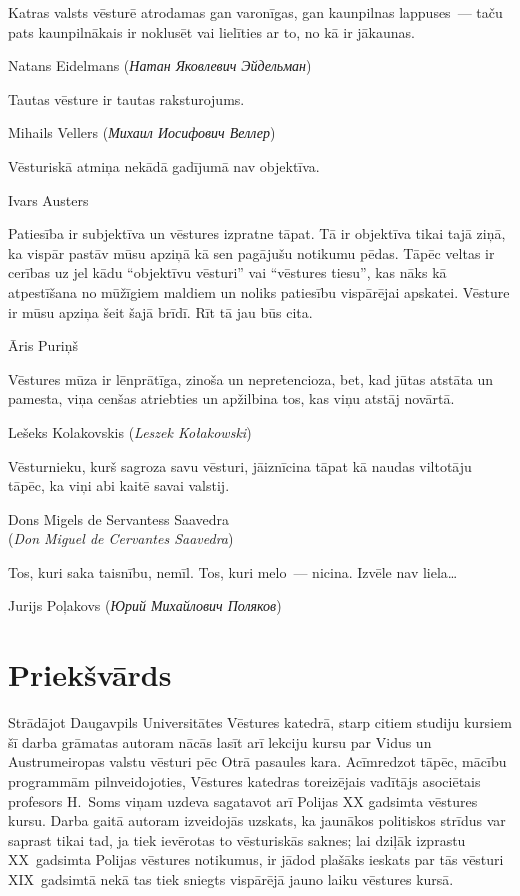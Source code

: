 \documentclass[twoside,a5paper,12pt,fleqn,openany]{extbook}
\newcommand{\pltxti}[1]{\textit{\textpolish{#1}}}
\newcommand{\rutxti}[1]{\textit{\textrussian{#1}}}
\newcommand{\estxti}[1]{\textit{\textspanish{#1}}}
\begin{document}
\epigraph
{Katras valsts vēsturē atrodamas gan varonīgas, gan kaunpilnas lappuses~--- taču pats kaunpilnākais ir noklusēt vai lielīties ar to, no kā ir jākaunas.}
{Natans Eidelmans (\rutxti{Натан Яковлевич Эйдельман})}

\epigraph
{Tautas vēsture ir tautas raksturojums.}
{Mihails Vellers (\rutxti{Михаил Иосифович Веллер})}

\epigraph
{Vēsturiskā atmiņa nekādā gadījumā nav objektīva.}
{Ivars Austers}

\newpage

\epigraph
{Patiesība ir subjektīva un vēstures izpratne tāpat.
Tā ir objektīva tikai tajā ziņā, ka vispār pastāv mūsu apziņā kā sen pagājušu notikumu pēdas.
Tāpēc veltas ir cerības uz jel kādu ``objektīvu vēsturi” vai ``vēstures tiesu”, kas nāks kā atpestīšana no mūžīgiem maldiem un noliks patiesību vispārējai apskatei.
Vēsture ir mūsu apziņa šeit šajā brīdī.
Rīt tā jau būs cita.}
{Āris Puriņš}

\epigraph
{Vēstures mūza ir lēnprātīga, zinoša un nepretencioza, bet, kad jūtas atstāta un pamesta, viņa cenšas atriebties un apžilbina tos, kas viņu atstāj novārtā.}
{Lešeks Kolakovskis (\pltxti{Leszek Kołakowski})}

\epigraph
{Vēsturnieku, kurš sagroza savu vēsturi, jāiznīcina tāpat kā naudas viltotāju tāpēc, ka viņi abi kaitē savai valstij.}
{Dons Migels de Servantess Saavedra\\(\estxti{Don Miguel de Cervantes Saavedra})}

\epigraph
{Tos, kuri saka taisnību, nemīl.
Tos, kuri melo~--- nicina.
Izvēle nav liela\ldots{}}
{Jurijs Poļakovs (\rutxti{Юрий Михайлович Поляков})}

\tableofcontents

\chapter*{Priekšvārds}

Strādājot Daugavpils Universitātes Vēstures katedrā, starp citiem studiju kursiem šī darba grāmatas autoram nācās lasīt arī lekciju kursu par Vidus un Austrumeiropas valstu vēsturi pēc Otrā pasaules kara.
Acīmredzot tāpēc, mācību programmām pilnveidojoties, Vēstures katedras toreizējais vadītājs asociētais profesors H.~Soms viņam uzdeva sagatavot arī Polijas XX gadsimta vēstures kursu.
Darba gaitā autoram izveidojās uzskats, ka jaunākos politiskos strīdus var saprast tikai tad, ja tiek ievērotas to vēsturiskās saknes; lai dziļāk izprastu XX~gadsimta Polijas vēstures notikumus, ir jādod plašāks ieskats par tās vēsturi XIX~gadsimtā nekā tas tiek sniegts vispārējā jauno laiku vēstures kursā.
\end{document}

